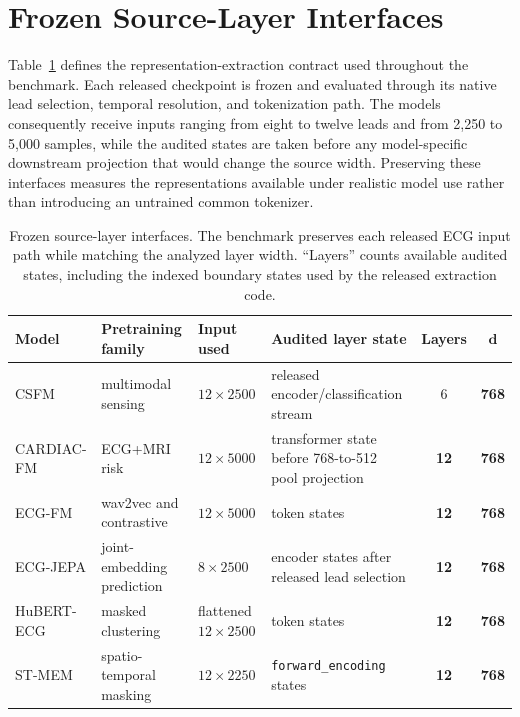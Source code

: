\clearpage
\section{Frozen Source-Layer Interfaces}
\label{app:model-interfaces}

Table~\ref{tab:multiscale-models} defines the representation-extraction contract used throughout the benchmark. Each released checkpoint is frozen and evaluated through its native lead selection, temporal resolution, and tokenization path. The models consequently receive inputs ranging from eight to twelve leads and from 2,250 to 5,000 samples, while the audited states are taken before any model-specific downstream projection that would change the source width. Preserving these interfaces measures the representations available under realistic model use rather than introducing an untrained common tokenizer.

\begin{table}[!t]
\centering
\small
\caption{Frozen source-layer interfaces. The benchmark preserves each released ECG input path while matching the analyzed layer width. ``Layers'' counts available audited states, including the indexed boundary states used by the released extraction code.}
\label{tab:multiscale-models}
\begin{tabular}{@{}lp{3.0cm}p{3.0cm}p{4.2cm}cc@{}}
\toprule
\textbf{Model} & \textbf{Pretraining family} & \textbf{Input used} & \textbf{Audited layer state} & \textbf{Layers} & $\boldsymbol{d}$ \\
\midrule
CSFM & multimodal sensing & $12\times2500$ & released encoder/classification stream & 6 & \textbf{768} \\
CARDIAC-FM & ECG+MRI risk & $12\times5000$ & transformer state before 768-to-512 pool projection & \textbf{12} & \textbf{768} \\
ECG-FM & wav2vec and contrastive & $12\times5000$ & token states & \textbf{12} & \textbf{768} \\
ECG-JEPA & joint-embedding prediction & $8\times2500$ & encoder states after released lead selection & \textbf{12} & \textbf{768} \\
HuBERT-ECG & masked clustering & flattened $12\times2500$ & token states & \textbf{12} & \textbf{768} \\
ST-MEM & spatio-temporal masking & $12\times2250$ & \texttt{forward\_encoding} states & \textbf{12} & \textbf{768} \\
\bottomrule
\end{tabular}
\end{table}

